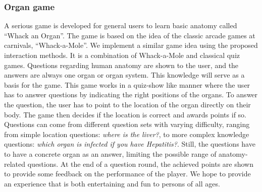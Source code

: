 
\subsubsection{Organ game}
A serious game is developed for general users to learn basic anatomy called ``Whack an Organ''. The game is based on the idea of the classic arcade games at carnivals, ``Whack-a-Mole''. We implement a similar game idea using the proposed interaction methods. It is a combination of Whack-a-Mole and classical quiz games. Questions regarding human anatomy are shown to the user, and the answers are always one organ or organ system. 
This knowledge will serve as a basis for the game. This game works in a quiz-show like manner where the user has to answer questions by indicating the right positions of the organs.
To answer the question, the user has to point to the location of the organ directly on their body. 
The game then decides if the location is correct and awards points if so. Questions can come from different question sets with varying difficulty, ranging from simple location questions: \textit{where is the liver?}, to more complex knowledge questions: \textit{which organ is infected if you have Hepatitis?}.
Still, the questions have to have a concrete organ as an answer, limiting the possible range of anatomy-related questions. At the end of a question round, the achieved points are shown to provide some feedback on the performance of the player.
We hope to provide an experience that is both entertaining and fun to persons of all ages.

